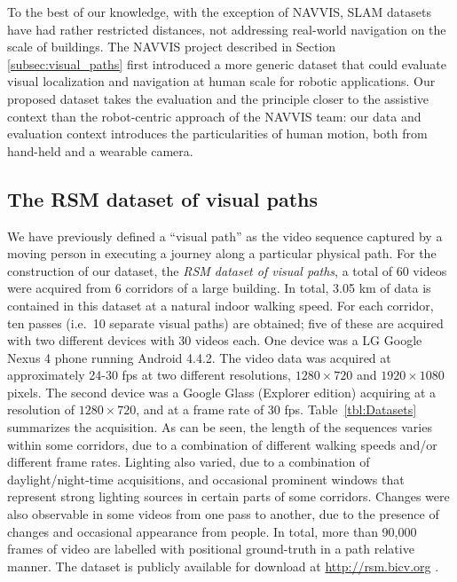 To the best of our knowledge, with the exception of NAVVIS, SLAM datasets have had rather restricted distances, not addressing real-world navigation on the scale of buildings. The NAVVIS project described in Section \ref{subsec:visual_paths} first introduced a more generic dataset that could evaluate visual localization and navigation at human scale for robotic applications. Our proposed dataset takes the evaluation and the principle closer to the assistive context than the robot-centric approach of the NAVVIS team: our data and evaluation context introduces the particularities of human motion, both from hand-held and a wearable camera.

\subsection{The RSM dataset of visual paths}

We have previously defined a ``visual path'' as the video sequence captured by a moving person in executing a journey along a particular physical path. For the construction of our dataset, the \textit{RSM dataset of visual paths}, a total of 60 videos were acquired from 6 corridors of a large building. In total, 3.05 km of data is contained in this dataset at a natural indoor walking speed.  For each corridor, ten passes (i.e.\ 10 separate visual paths) are obtained; five of these are acquired with two different devices with 30 videos each. One device was a LG Google Nexus 4 phone running Android 4.4.2.  The video data was acquired at approximately 24-30 fps at two different resolutions, $1280 \times 720$ and $1920\times 1080$ pixels.  The second device was a Google Glass (Explorer edition) acquiring at a resolution of $1280 \times 720$, and at a frame rate of 30 fps. Table~\ref{tbl:Datasets} summarizes the acquisition.  As can be seen, the length of the sequences varies within some corridors, due to a combination of different walking speeds and/or different frame rates. Lighting also varied, due to a combination of daylight/night-time acquisitions, and occasional prominent windows that represent strong lighting sources in certain parts of some corridors.  Changes were also observable in some videos from one pass to another, due to the presence of changes and occasional appearance from people. In total, more than 90,000 frames of video are labelled with positional ground-truth in a path relative manner. The dataset is publicly available for download at \url{http://rsm.bicv.org} \cite{Rivera-Rubio2014}.

